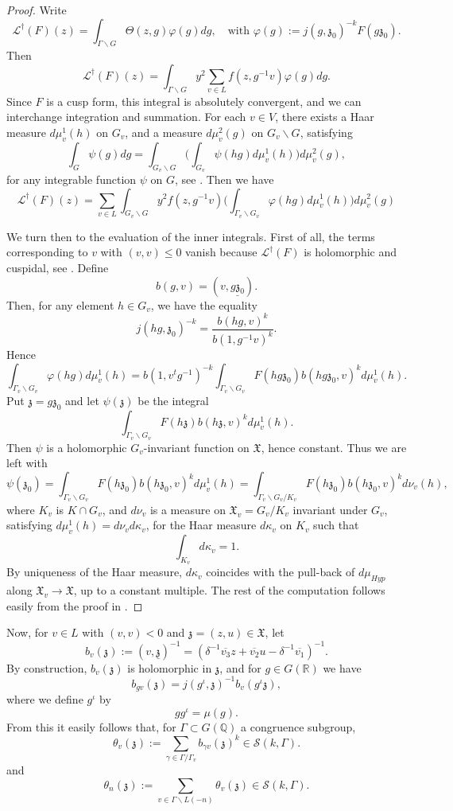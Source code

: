 \documentclass[12pt,a4paper,reqno]{amsart}
\theoremstyle{definition}
\numberwithin{definition}{subsection}
\theoremstyle{definition}
\numberwithin{Definition}{subsection}
\theoremstyle{remark}
\theoremstyle{remark}
\numberwithin{Remark}{subsection}
\theoremstyle{remark}
\theoremstyle{plain}
\numberwithin{Theorem}{subsection}
\theoremstyle{plain}
\theoremstyle{plain}
\theoremstyle{plain}
\theoremstyle{plain}
\theoremstyle{plain}
\theoremstyle{plain}
\theoremstyle{plain}
\newcommand*{\Q}{\mathbb{Q}}
\newcommand*{\R}{\mathbb{R}}
\begin{document}
\begin{proof}
Write
\[
\mathcal{L}^\dagger(F)(z)=\int_{\Gamma\backslash G}\Theta(z,g)\varphi(g)dg,\quad \text{with   } \varphi(g):=j(g,\mathfrak{z}_0)^{-k}F(g\mathfrak{z}_0).
\]
Then 
\[
\mathcal{L}^\dagger(F)(z)=\int_{\Gamma\backslash G} y^2\sum_{v\in L}f(z,g^{-1}v)\varphi(g)dg.
\]
Since $F$ is a cusp form, this integral is absolutely convergent, and we can interchange integration and summation. For each $v\in V$, there exists a Haar measure $d\mu_v^1(h)$ on $G_v$, and a measure $d\mu_v^2(g)$ on $G_v\backslash G$, satisfying
\[
\int_G\psi(g)dg=\int_{G_v\backslash G}\Big(\int_{G_v}\psi(hg)d\mu_v^1(h)\Big)d\mu_v^2(g),
\]
for any integrable function $\psi$ on $G$, see \cite[p. 108]{oda}. Then we have
\[
\mathcal{L}^\dagger(F)(z)=\sum_{v\in L}\int_{G_v\backslash G}y^2f(z,g^{-1}v)\Big(\int_{\Gamma_v\backslash G_v} \varphi(hg)d\mu_v^1(h)\Big)d\mu_v^2(g)
\]

We turn then to the evaluation of the inner integrals. First of all, the terms corresponding to $v$ with $(v,v)\leq 0$ vanish because $\mathcal{L}^\dagger(F)$ is holomorphic and cuspidal, see \cite[p. 13]{kudlaq}.
Define 
\[
b(g,v)=(v,\underline{g\mathfrak{z}_0}).
\]
Then, for any element $h\in G_v$, we have the equality
\[
j(hg,\mathfrak{z}_0)^{-k}=\frac{b(hg,v)^k}{b(1,g^{-1}v)^k}.
\]
Hence
\[
\int_{\Gamma_v\backslash G_v}\varphi(hg)d\mu_v^1(h)=b(1,v^tg^{-1})^{-k}\int_{\Gamma_v\backslash G_v}F(hg\mathfrak{z}_0)b(hg\mathfrak{z}_0,v)^kd\mu_v^1(h).
\]
Put $\mathfrak{z}=g\mathfrak{z}_0$ and let $\psi(\mathfrak{z})$ be the integral
\[
\int_{\Gamma_v\backslash G_v}F(h\mathfrak{z})b(h\mathfrak{z},v)^kd\mu_v^1(h).
\]
Then $\psi$ is a holomorphic $G_v$-invariant function on $\mathfrak{X}$, hence constant.
Thus we are left with
\[
\psi(\mathfrak{z}_0)=\int_{\Gamma_v\backslash G_v}F(h\mathfrak{z}_0)b(h\mathfrak{z}_0,v)^kd\mu_v^1(h)=\int_{\Gamma_v\backslash G_v/K_v}F(h\mathfrak{z}_0)b(h\mathfrak{z}_0,v)^kd\nu_v(h),
\]
where $K_v$ is $K\cap G_v$, and $d\nu_v$ is a measure on $\mathfrak{X}_v=G_v/K_v$ invariant under $G_v$, satisfying $d\mu_v^1(h)=d\nu_vd\kappa_v$, for the Haar measure $d\kappa_v$ on $K_v$ such that
\[
\int_{K_v}d\kappa_v=1.
\]
By uniqueness of the Haar measure, $d\kappa_v$ coincides with the pull-back of $d\mu_{Hyp}$ along $\mathfrak{X}_v\to \mathfrak{X}$, up to a constant multiple. The rest of the computation follows easily from the proof in \cite[p. 112]{oda}.

\end{proof}

Now, for $v\in L$ with $(v,v)<0$ and $\mathfrak{z}=(z,u)\in \mathfrak{X}$, let
\[
b_v(\mathfrak{z}):=(v,\underline{\mathfrak{z}})^{-1}=(\delta^{-1}\overline{v_3}z+\overline{v_2}u-\delta^{-1}\overline{v_1})^{-1}.
\]
By construction, $b_v(\mathfrak{z})$ is holomorphic in $\mathfrak{z}$, and for $g\in G(\R)$ we have
\[
b_{gv}(\mathfrak{z})=j(g^\iota,\mathfrak{z})^{-1}b_v(g^\iota\mathfrak{z}),
\]
where we define $g^\iota$ by
\[
gg^\iota=\mu(g).
\]
From this it easily follows that, for $\Gamma\subset G(\Q)$ a congruence subgroup,
\[
\theta_v(\mathfrak{z}):=\sum_{\gamma\in \Gamma/\Gamma_v}b_{\gamma v}(\mathfrak{z})^{k}\in \mathscr{S}(k,\Gamma).
\]
and
\[
\theta_n(\mathfrak{z}):=\sum_{v\in \Gamma\backslash L(-n)}\theta_v(\mathfrak{z})\in \mathscr{S}(k,\Gamma).
\]
\end{document}
